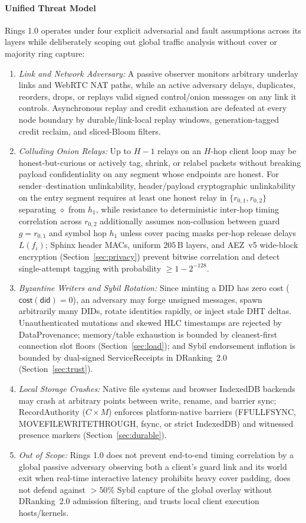 \documentclass[journal]{IEEEtran}
\DeclareRobustCommand{\code}[1]{{\ttfamily\renewcommand{\_}{\textunderscore\allowbreak}#1}}
\begin{document}
\paragraph*{Unified Threat Model}
Rings 1.0 operates under four explicit adversarial and fault assumptions across its layers while deliberately scoping out global traffic analysis without cover or majority ring capture:
\begin{enumerate}[leftmargin=*,noitemsep,topsep=1pt]
\item \emph{Link and Network Adversary:} A passive observer monitors arbitrary underlay links and WebRTC NAT paths, while an active adversary delays, duplicates, reorders, drops, or replays valid signed control/onion messages on any link it controls. Asynchronous replay and credit exhaustion are defeated at every node boundary by durable/link-local replay windows, generation-tagged credit reclaim, and sliced-Bloom filters.
\item \emph{Colluding Onion Relays:} Up to $H-1$ relays on an $H$-hop client loop may be honest-but-curious or actively tag, shrink, or relabel packets without breaking payload confidentiality on any segment whose endpoints are honest. For sender--destination unlinkability, header/payload cryptographic unlinkability on the entry segment requires at least one honest relay in $\{r_{0,1},r_{0,2}\}$ separating $\diamond$ from $h_1$, while resistance to deterministic inter-hop timing correlation across $r_{0,2}$ additionally assumes non-collusion between guard $g=r_{0,1}$ and symbol hop $h_1$ unless cover pacing masks per-hop release delays $L(f_i)$; Sphinx header MACs, uniform $205\,\mathrm{B}$ layers, and AEZ~v5 wide-block encryption (Section~\ref{sec:privacy}) prevent bitwise correlation and detect single-attempt tagging with probability $\ge 1-2^{-128}$.
\item \emph{Byzantine Writers and Sybil Rotation:} Since minting a DID has zero cost ($\mathsf{cost}(\mathsf{did})=0$), an adversary may forge unsigned messages, spawn arbitrarily many DIDs, rotate identities rapidly, or inject stale DHT deltas. Unauthenticated mutations and skewed HLC timestamps are rejected by \code{DataProvenance}; memory/table exhaustion is bounded by cleanest-first connection slot floors (Section~\ref{sec:load}); and Sybil endorsement inflation is bounded by dual-signed \code{ServiceReceipt}s in DRanking~2.0 (Section~\ref{sec:trust}).
\item \emph{Local Storage Crashes:} Native file systems and browser IndexedDB backends may crash at arbitrary points between write, rename, and barrier sync; \code{RecordAuthority} ($C\times M$) enforces platform-native barriers (\code{F\_FULLFSYNC}, \code{MOVEFILE\_WRITE\_THROUGH}, \code{fsync}, or strict IndexedDB) and witnessed presence markers (Section~\ref{sec:durable}).
\item \emph{Out of Scope:} Rings 1.0 does not prevent end-to-end timing correlation by a global passive adversary observing both a client's guard link and its world exit when real-time interactive latency prohibits heavy cover padding, does not defend against $>50\%$ Sybil capture of the global overlay without DRanking~2.0 admission filtering, and trusts local client execution hosts/kernels.
\end{enumerate}
\end{document}
